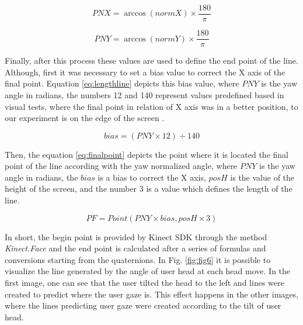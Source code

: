 \documentclass[10pt, conference]{IEEEtran}
\begin{document}
	\begin{equation}
    	PNX = \arccos{(normX)} \times \frac{180}{\pi}
		\label{eq:pitchTransformation}
	\end{equation}
    
    \begin{equation}
    	PNY = \arccos{(normY)} \times \frac{180}{\pi}
		\label{eq:yawTransformation}
	\end{equation}

	Finally, after this process these values are used to define the end point of the line. Although, first it was necessary to set a bias value to correct the X axis of the final point. Equation \ref{eq:lengthline} depicts this bias value, where $PNY$ is the yaw angle in radians, the numbers 12 and 140 represent values predefined based in visual tests, where the final point in relation of X axis was in a better position, to our experiment is on the edge of the screen .
    
    \begin{equation}
    	bias = (PNY \times 12) \div 140
		\label{eq:lengthline}
	\end{equation}
    
      Then, the equation \ref{eq:finalpoint} depicts the point where it is located the final point of the line according with the yaw normalized angle, where $PNY$ is the yaw angle in radians, the $bias$ is a bias to correct the X axis, $posH$ is the value of the height of the screen, and the number 3 is a value which defines the length of the line.
    
    \begin{equation}
    	PF = Point(PNY \times bias, posH \times 3)
		\label{eq:finalpoint}
	\end{equation}
   
     
	In short, the begin point is provided by Kinect SDK through the method \emph{Kinect.Face} and the end point is calculated after a series of formulas and conversions starting from the quaternions. 
	In Fig. \ref{fig:fig6} it is possible to visualize the line generated by the angle of user head at each head move. 
	In the first image, one can see that the user tilted the head to the left and lines were created to predict where the user gaze is. 
	This effect happens in the other images, where the lines predicting user gaze were created according to the tilt of user head.
\end{document}
